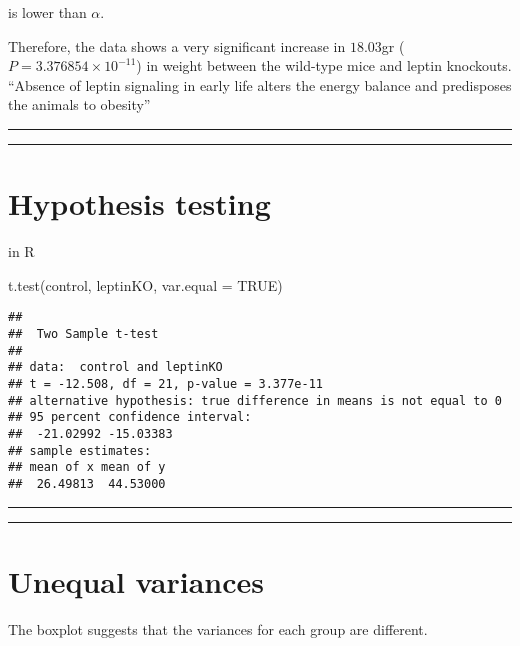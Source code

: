 \documentclass[
]{book}
\newenvironment{Shaded}{\begin{snugshade}}{\end{snugshade}}
\newcommand{\AttributeTok}[1]{\textcolor[rgb]{0.77,0.63,0.00}{#1}}
\newcommand{\ConstantTok}[1]{\textcolor[rgb]{0.00,0.00,0.00}{#1}}
\newcommand{\FunctionTok}[1]{\textcolor[rgb]{0.00,0.00,0.00}{#1}}
\newcommand{\NormalTok}[1]{#1}
\begin{document}
is lower than \(\alpha\).

Therefore, the data shows a very significant increase in \(18.03\)gr (\(P=3.376854 \times 10^{-11}\)) in weight between the wild-type mice and leptin knockouts. ``Absence of leptin signaling in early life alters the energy balance and predisposes the animals to obesity''

\begin{center}\rule{0.5\linewidth}{0.5pt}\end{center}

\begin{center}\rule{0.5\linewidth}{0.5pt}\end{center}

\hypertarget{hypothesis-testing-4}{%
\section{Hypothesis testing}\label{hypothesis-testing-4}}

in R

\begin{Shaded}
\begin{Highlighting}[]
\FunctionTok{t.test}\NormalTok{(control, leptinKO, }\AttributeTok{var.equal =} \ConstantTok{TRUE}\NormalTok{)}
\end{Highlighting}
\end{Shaded}

\begin{verbatim}
## 
##  Two Sample t-test
## 
## data:  control and leptinKO
## t = -12.508, df = 21, p-value = 3.377e-11
## alternative hypothesis: true difference in means is not equal to 0
## 95 percent confidence interval:
##  -21.02992 -15.03383
## sample estimates:
## mean of x mean of y 
##  26.49813  44.53000
\end{verbatim}

\begin{center}\rule{0.5\linewidth}{0.5pt}\end{center}

\begin{center}\rule{0.5\linewidth}{0.5pt}\end{center}

\hypertarget{unequal-variances}{%
\section{Unequal variances}\label{unequal-variances}}

The boxplot suggests that the variances for each group are different.
\end{document}
